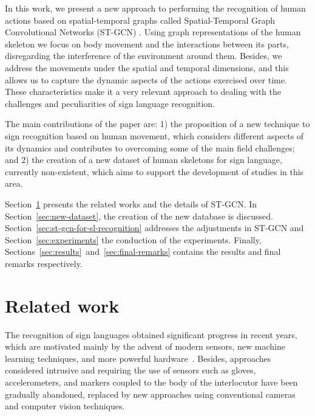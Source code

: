 In this work, we present a new approach to performing the recognition of human actions based on spatial-temporal graphs called Spatial-Temporal Graph Convolutional Networks (ST-GCN) \cite {st-gcn-2018}. Using graph representations of the human skeleton we focus on body movement and the interactions between its parts, disregarding the interference of the environment around them. Besides, we address the movements under the spatial and temporal dimensions, and this allows us to capture the dynamic aspects of the actions exercised over time. These characteristics make it a very relevant approach to dealing with the challenges and peculiarities of sign language recognition.
 

The main contributions of the paper are: 1) the proposition of a new technique to sign recognition based on human movement, which considers different aspects of its dynamics and contributes to overcoming some of the main field challenges; and 2) the creation of a new dataset of human skeletons for sign language, currently non-existent, which aims to support the development of studies in this area.

Section~\ref{sec:related-work} presents the related works and the details of ST-GCN. In Section~\ref{sec:new-dataset},  the creation of the new database is discussed.
Section~\ref{sec:st-gcn-for-sl-recognition} addresses the adjustments in ST-GCN and Section~\ref{sec:experiments} the conduction of the experiments. Finally, Sections~\ref{sec:results}~and~\ref{sec:final-remarks} contains the results and final remarks respectively. %

\section{Related work}
\label{sec:related-work}

The recognition of sign languages obtained significant progress in recent years, which are motivated mainly by the advent of modern sensors, new machine learning techniques, and more powerful hardware~\cite{recent-advances-dl-2017}. Besides, approaches considered intrusive and requiring the use of sensors such as gloves, accelerometers, and markers coupled to the body of the interlocutor have been gradually abandoned, replaced by new approaches using conventional cameras and computer vision techniques.

